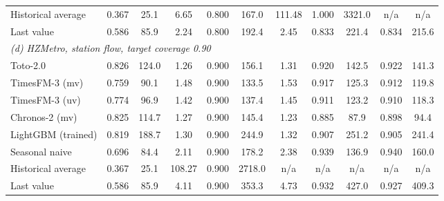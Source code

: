 \documentclass[utf8]{FrontiersinHarvard}
\theoremstyle{plain}
\theoremstyle{definition}
\theoremstyle{remark}
\begin{document}
{\begin{table}[htbp]
\begin{tabular}{lcc@{\hspace{9pt}}ccc@{\hspace{9pt}}ccc@{\hspace{9pt}}cc}
Historical average  & 0.367 & 25.1 & 6.65 & 0.800 & 167.0 & 111.48 & 1.000 & 3321.0 & n/a & n/a \\
Last value          & 0.586 & 85.9 & 2.24 & 0.800 & 192.4 & 2.45 & 0.833 & 221.4 & 0.834 & 215.6 \\
\midrule
\multicolumn{11}{l}{\emph{(d) HZMetro, station flow, target coverage \num{0.90}}}\\
Toto-2.0            & 0.826 & 124.0 & 1.26 & 0.900 & 156.1 & 1.31 & 0.920 & 142.5 & 0.922 & 141.3 \\
TimesFM-3 (mv)      & 0.759 & 90.1 & 1.48 & 0.900 & 133.5 & 1.53 & 0.917 & 125.3 & 0.912 & 119.8 \\
TimesFM-3 (uv)      & 0.774 & 96.9 & 1.42 & 0.900 & 137.4 & 1.45 & 0.911 & 123.2 & 0.910 & 118.3 \\
Chronos-2 (mv)      & 0.825 & 114.7 & 1.27 & 0.900 & 145.4 & 1.23 & 0.885 & 87.9 & 0.898 & 94.4 \\
LightGBM (trained)  & 0.819 & 188.7 & 1.30 & 0.900 & 244.9 & 1.32 & 0.907 & 251.2 & 0.905 & 241.4 \\
Seasonal naive      & 0.696 & 84.4 & 2.11 & 0.900 & 178.2 & 2.38 & 0.939 & 136.9 & 0.940 & 160.0 \\
Historical average  & 0.367 & 25.1 & 108.27 & 0.900 & 2718.0 & n/a & n/a & n/a & n/a & n/a \\
Last value          & 0.586 & 85.9 & 4.11 & 0.900 & 353.3 & 4.73 & 0.932 & 427.0 & 0.927 & 409.3 \\
\bottomrule
\end{tabular}
\end{table}}
\end{document}
